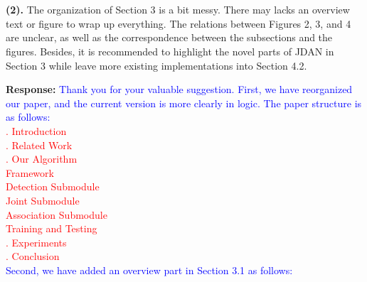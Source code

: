 \documentclass[12pt,journal,onecolumn]{IEEEtran}
\begin{document}
\\ \\
\vspace{8pt} 


\textbf{(2).} The organization of Section 3 is a bit messy. 
There may lacks an overview text or figure to wrap up everything. 
The relations between Figures 2, 3, and 4 are unclear, as well as the correspondence between the subsections and the figures. 
Besides, it is recommended to highlight the novel parts of JDAN in Section 3 while leave more existing implementations into Section 4.2.

\textbf{Response:} \textcolor{blue}{Thank you for your valuable suggestion. 
First, we have reorganized our paper, and the current version is more clearly in logic.
The paper structure is as follows: 
} \\
\textcolor{red}{
\indent {}. Introduction \\
\indent {}. Related Work \\
\indent {}. Our Algorithm \\
\indent \indent \indent {} Framework \\
\indent \indent \indent {} Detection Submodule \\
\indent \indent \indent {} Joint Submodule \\
\indent \indent \indent {} Association Submodule \\
\indent \indent \indent {} Training and Testing \\
\indent {}. Experiments \\
\indent {}. Conclusion \\
}
\textcolor{blue}{
Second, we have added an overview part in Section 3.1 as follows: \\
}
\end{document}
